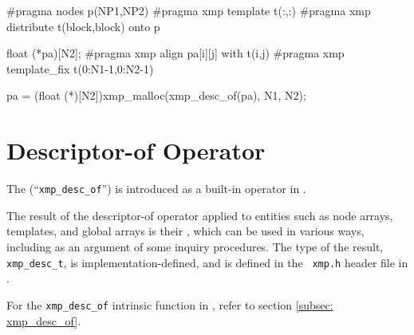 \begin{XCexample}
#pragma nodes p(NP1,NP2)
#pragma xmp template t(:,:)
#pragma xmp distribute t(block,block) onto p

float (*pa)[N2];
#pragma xmp align pa[i][j] with t(i,j)
#pragma xmp template_fix t(0:N1-1,0:N2-1)

pa = (float (*)[N2])xmp_malloc(xmp_desc_of(pa), N1, N2);
\end{XCexample}

\section{Descriptor-of Operator}
\label{sec:Descriptor of Global Data in C}


The  (``{\tt xmp\_desc\_of}'') is
introduced as a built-in operator in {\XMPC}.

The result of the descriptor-of operator applied to {\XMP} entities such
as node arrays, templates, and global arrays is their {\it
{}}, which can be used in various ways, including as an
argument of some inquiry procedures. The type of the result, {\tt
xmp\_desc\_t}, is implementation-defined, and is defined in the {\tt
xmp.h} header file in {\XMPC}.

For the {\tt xmp\_desc\_of} intrinsic function in {\XMPF}, refer to
section \ref{subsec: xmp_desc_of}.

